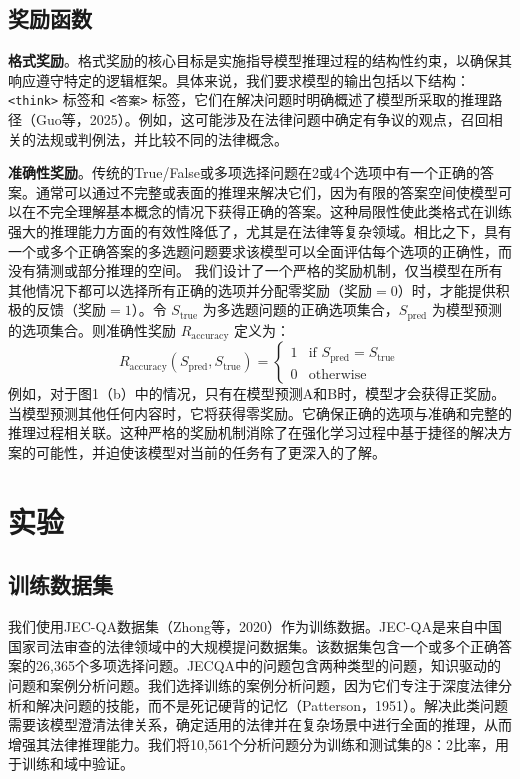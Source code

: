 \documentclass{pkuthesis}
\begin{document}
\subsection{奖励函数}
\textbf{格式奖励}。格式奖励的核心目标是实施指导模型推理过程的结构性约束，以确保其响应遵守特定的逻辑框架。具体来说，我们要求模型的输出包括以下结构：\texttt{<think>} 标签和 \texttt{<答案>} 标签，它们在解决问题时明确概述了模型所采取的推理路径（Guo等，2025）。例如，这可能涉及在法律问题中确定有争议的观点，召回相关的法规或判例法，并比较不同的法律概念。

\textbf{准确性奖励}。传统的True/False或多项选择问题在2或4个选项中有一个正确的答案。通常可以通过不完整或表面的推理来解决它们，因为有限的答案空间使模型可以在不完全理解基本概念的情况下获得正确的答案。这种局限性使此类格式在训练强大的推理能力方面的有效性降低了，尤其是在法律等复杂领域。相比之下，具有一个或多个正确答案的多选题问题要求该模型可以全面评估每个选项的正确性，而没有猜测或部分推理的空间。
我们设计了一个严格的奖励机制，仅当模型在所有其他情况下都可以选择所有正确的选项并分配零奖励（奖励$=0$）时，才能提供积极的反馈（奖励$=1$）。令 $S_{\text{true}}$ 为多选题问题的正确选项集合，$S_{\text{pred}}$ 为模型预测的选项集合。则准确性奖励 $R_{\text{accuracy}}$ 定义为：
$$ R_{\text{accuracy}}(S_{\text{pred}}, S_{\text{true}}) = \begin{cases} 1 & \text{if } S_{\text{pred}} = S_{\text{true}} \\ 0 & \text{otherwise} \end{cases} $$
例如，对于图1（b）中的情况，只有在模型预测A和B时，模型才会获得正奖励。当模型预测其他任何内容时，它将获得零奖励。它确保正确的选项与准确和完整的推理过程相关联。这种严格的奖励机制消除了在强化学习过程中基于捷径的解决方案的可能性，并迫使该模型对当前的任务有了更深入的了解。

\section{实验}
\subsection{训练数据集}
我们使用JEC-QA数据集（Zhong等，2020）作为训练数据。JEC-QA是来自中国国家司法审查的法律领域中的大规模提问数据集。该数据集包含一个或多个正确答案的26,365个多项选择问题。JECQA中的问题包含两种类型的问题，知识驱动的问题和案例分析问题。我们选择训练的案例分析问题，因为它们专注于深度法律分析和解决问题的技能，而不是死记硬背的记忆（Patterson，1951）。解决此类问题需要该模型澄清法律关系，确定适用的法律并在复杂场景中进行全面的推理，从而增强其法律推理能力。我们将10,561个分析问题分为训练和测试集的8：2比率，用于训练和域中验证。
\end{document}
